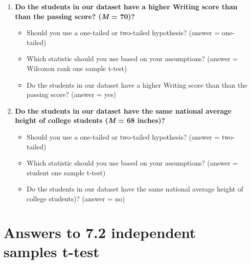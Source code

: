\documentclass[
]{book}
\begin{document}
\begin{enumerate}
\def\labelenumi{\arabic{enumi}.}
\item
  \textbf{Do the students in our dataset have a higher Writing score than than the passing score? (\emph{M} = 70)?}

  \begin{itemize}
  \item
    Should you use a one-tailed or two-tailed hypothesis? (answer = one-tailed)
  \item
    Which statistic should you use based on your assumptions? (answer = Wilcoxon rank one sample t-test)
  \item
    Do the students in our dataset have a higher Writing score than than the passing score? (answer = yes)
  \end{itemize}
\item
  \textbf{Do the students in our dataset have the same national average height of college students (\emph{M} = 68 inches)?}

  \begin{itemize}
  \item
    Should you use a one-tailed or two-tailed hypothesis? (answer = two-tailed)
  \item
    Which statistic should you use based on your assumptions? (answer = student one sample t-test)
  \item
    Do the students in our dataset have the same national average height of college students)? (answer = no)
  \end{itemize}
\end{enumerate}

\hypertarget{answers-to-7.2-independent-samples-t-test}{%
\section{Answers to 7.2 independent samples t-test}\label{answers-to-7.2-independent-samples-t-test}}
\end{document}
